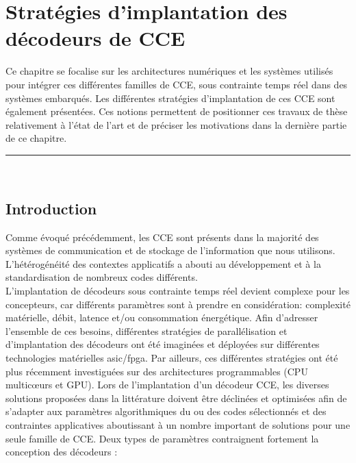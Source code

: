 \documentclass[../main.tex]{subfiles}
\begin{document}
%
%
%
%
\chapter{Stratégies d'implantation des décodeurs de CCE} 
\label{chapter:2_2}
%
%
%
%
%

Ce chapitre se focalise sur les architectures numériques et les systèmes utilisés pour intégrer ces différentes familles de CCE, sous contrainte temps réel dans des systèmes embarqués.
Les différentes stratégies d’implantation de ces CCE sont également présentées. Ces notions permettent de positionner ces travaux de thèse relativement à l'état de l'art et de préciser les motivations dans la dernière partie de ce chapitre.

%
%
%
%
%
%
%
\etocsettocstyle{
    { \large \hspace{-1.5 em} \textbf{} \hfill}
    \vspace{-2.5 em}\\\par\noindent\rule{\linewidth}{1 pt}\vspace{-.2 em}
    }
{\par\noindent\rule{\linewidth}{1 pt}\\}
\localtableofcontents

%
% 
% 
% 
% 
\section{Introduction}
% 
% 
% 
% 

Comme évoqué précédemment, les CCE sont présents dans la majorité des systèmes de communication et de stockage de l’information que nous utilisons. L'hétérogénéité des contextes applicatifs a abouti au développement et à la standardisation de nombreux codes différents.\\
L’implantation de décodeurs sous contrainte temps réel devient complexe pour les concepteurs, car différents paramètres sont à prendre en considération: complexité matérielle, débit, latence et/ou consommation énergétique. Afin d'adresser l’ensemble de ces besoins, différentes stratégies de parallélisation et d’implantation des décodeurs ont été imaginées et déployées sur différentes technologies matérielles \acrshort{asic}/\acrshort{fpga}. Par ailleurs, ces différentes stratégies ont été plus récemment investiguées sur des architectures programmables (CPU multicœurs et GPU). Lors de l’implantation d’un décodeur CCE, les diverses solutions proposées dans la littérature doivent être déclinées et optimisées afin de s’adapter aux paramètres algorithmiques du ou des codes sélectionnés et des contraintes applicatives aboutissant à un nombre important de solutions pour une seule famille de CCE. Deux types de paramètres contraignent fortement la conception des décodeurs :
\end{document}
